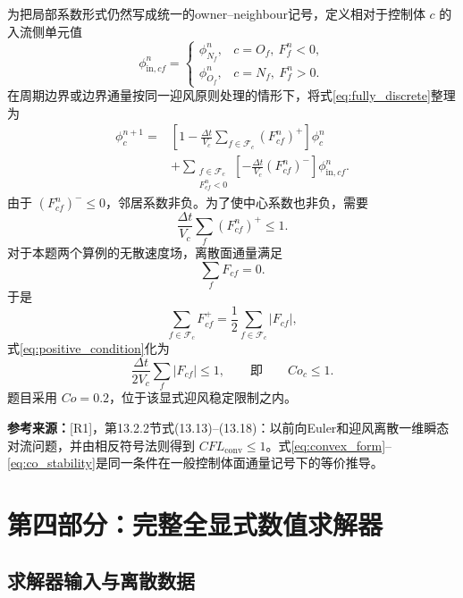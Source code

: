 \documentclass[UTF8,12pt,a4paper]{ctexart}
\numberwithin{equation}{section}
\newcommand{\Rone}{\textnormal{[R1]}}
\newcommand{\source}[1]{%
  \par\smallskip
  \noindent\colorbox{sourcebg}{%
    \parbox{0.955\linewidth}{\footnotesize\color{sourcegray}\textbf{参考来源：}#1}%
  }
  \par\smallskip
}
\begin{document}
为把局部系数形式仍然写成统一的owner--neighbour记号，定义相对于控制体 $c$ 的入流侧单元值
\begin{equation}
  \phi_{\mathrm{in},cf}^n=
  \begin{cases}
    \phi_{N_f}^n,&c=O_f,\ F_f^n<0,\\
    \phi_{O_f}^n,&c=N_f,\ F_f^n>0.
  \end{cases}
  \label{eq:incoming_cell_value}
\end{equation}
在周期边界或边界通量按同一迎风原则处理的情形下，将式\eqref{eq:fully_discrete}整理为
\begin{align}
  \phi_c^{n+1}
  =&\left[
    1-\frac{\Delta t}{V_c}
    \sum_{f\in\mathcal F_c}(F_{cf}^n)^+
  \right]\phi_c^n
  \nonumber\\
  &+\sum_{\substack{f\in\mathcal F_c\\F_{cf}^n<0}}
  \left[
    -\frac{\Delta t}{V_c}(F_{cf}^n)^-
  \right]\phi_{\mathrm{in},cf}^n.
  \label{eq:convex_form}
\end{align}
由于 $(F_{cf}^n)^-\le0$，邻居系数非负。为了使中心系数也非负，需要
\begin{equation}
  \frac{\Delta t}{V_c}\sum_f(F_{cf}^n)^+\le1.
  \label{eq:positive_condition}
\end{equation}
对于本题两个算例的无散速度场，离散面通量满足
\begin{equation}
  \sum_fF_{cf}=0.
  \label{eq:discrete_div_free}
\end{equation}
于是
\begin{equation}
  \sum_{f\in\mathcal F_c}F_{cf}^+
  =\frac12\sum_{f\in\mathcal F_c}|F_{cf}|,
  \label{eq:positive_half_abs}
\end{equation}
式\eqref{eq:positive_condition}化为
\begin{equation}
  \frac{\Delta t}{2V_c}\sum_f|F_{cf}|\le1,
  \qquad\text{即}\qquad Co_c\le1.
  \label{eq:co_stability}
\end{equation}
题目采用 $Co=0.2$，位于该显式迎风稳定限制之内。

\source{\Rone，第13.2.2节式(13.13)--(13.18)：以前向Euler和迎风离散一维瞬态对流问题，并由相反符号法则得到 $CFL_{\mathrm{conv}}\le1$。式\eqref{eq:convex_form}--\eqref{eq:co_stability}是同一条件在一般控制体面通量记号下的等价推导。}

\newpage
\section{第四部分：完整全显式数值求解器}

\subsection{求解器输入与离散数据}
\end{document}
